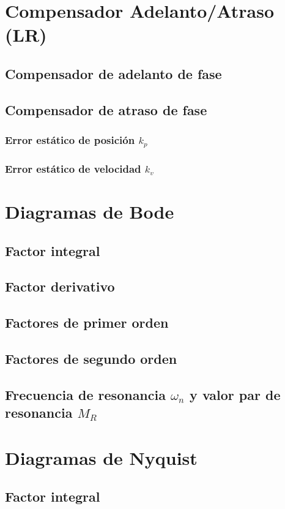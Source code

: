 \documentclass[12pt]{article}
\numberwithin{equation}{subsection}
\begin{document}
\newpage
\section{Compensador Adelanto/Atraso (LR)}
\subsection{Compensador de adelanto de fase}
\subsection{Compensador de atraso de fase}
\subsubsection{Error estático de posición $k_p$}
\subsubsection{Error estático de velocidad $k_v$}

\newpage
\section{Diagramas de Bode}
\subsection{Factor integral}
\subsection{Factor derivativo}
\subsection{Factores de primer orden}
\subsection{Factores de segundo orden}
\subsection{Frecuencia de resonancia $\omega_n$ y valor par de resonancia $M_R$}

\newpage
\section{Diagramas de Nyquist}
\subsection{Factor integral}
\end{document}
